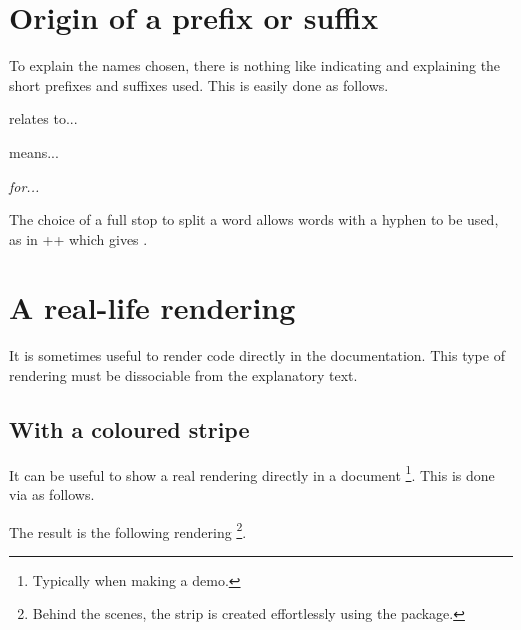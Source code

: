 

\section{Origin of a prefix or suffix}

To explain the names chosen, there is nothing like indicating and explaining the short prefixes and suffixes used. This is easily done as follows.


\begin{tdoclatex}[sbs]
 relates to...

 means...

\emph{ for...}
\end{tdoclatex}


\begin{tdocrem}
    The choice of a full stop to split a word allows words with a hyphen to be used, as in \tdocinlatex++ which gives .
\end{tdocrem}


\section{A real-life rendering} \label{tdoc-showcase}

It is sometimes useful to render code directly in the documentation. This type of rendering must be dissociable from the explanatory text.




\subsection{With a coloured stripe}

\begin{tdocexa} 
    It can be useful to show a real rendering directly in a document
    \footnote{
        Typically when making a demo.
    }.
    This is done via  as follows.


    The result is the following rendering
    \footnote{
        Behind the scenes, the strip is created effortlessly using the  package.
    }.

    \medskip

    
\end{tdocexa}


